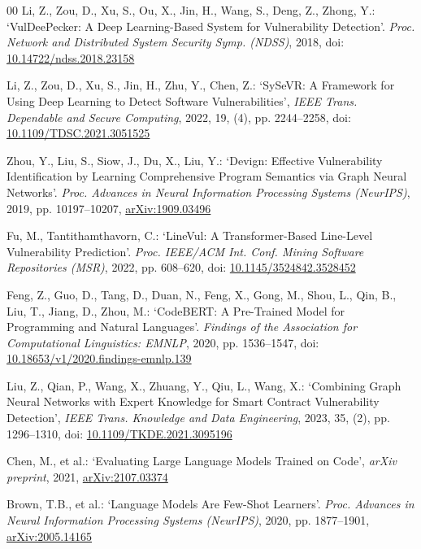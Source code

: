 \documentclass{ieeeaccess}
\begin{document}
\begin{thebibliography}{00}
Li, Z., Zou, D., Xu, S., Ou, X., Jin, H., Wang, S., Deng, Z., Zhong, Y.: `VulDeePecker: A Deep Learning-Based System for Vulnerability Detection'. \textit{Proc. Network and Distributed System Security Symp. (NDSS)}, 2018, doi: \href{https://doi.org/10.14722/ndss.2018.23158}{10.14722/ndss.2018.23158}

Li, Z., Zou, D., Xu, S., Jin, H., Zhu, Y., Chen, Z.: `SySeVR: A Framework for Using Deep Learning to Detect Software Vulnerabilities', \textit{IEEE Trans. Dependable and Secure Computing}, 2022, 19, (4), pp. 2244--2258, doi: \href{https://doi.org/10.1109/TDSC.2021.3051525}{10.1109/TDSC.2021.3051525}

Zhou, Y., Liu, S., Siow, J., Du, X., Liu, Y.: `Devign: Effective Vulnerability Identification by Learning Comprehensive Program Semantics via Graph Neural Networks'. \textit{Proc. Advances in Neural Information Processing Systems (NeurIPS)}, 2019, pp. 10197--10207, \href{https://arxiv.org/abs/1909.03496}{arXiv:1909.03496}

Fu, M., Tantithamthavorn, C.: `LineVul: A Transformer-Based Line-Level Vulnerability Prediction'. \textit{Proc. IEEE/ACM Int. Conf. Mining Software Repositories (MSR)}, 2022, pp. 608--620, doi: \href{https://doi.org/10.1145/3524842.3528452}{10.1145/3524842.3528452}

Feng, Z., Guo, D., Tang, D., Duan, N., Feng, X., Gong, M., Shou, L., Qin, B., Liu, T., Jiang, D., Zhou, M.: `CodeBERT: A Pre-Trained Model for Programming and Natural Languages'. \textit{Findings of the Association for Computational Linguistics: EMNLP}, 2020, pp. 1536--1547, doi: \href{https://doi.org/10.18653/v1/2020.findings-emnlp.139}{10.18653/v1/2020.findings-emnlp.139}

Liu, Z., Qian, P., Wang, X., Zhuang, Y., Qiu, L., Wang, X.: `Combining Graph Neural Networks with Expert Knowledge for Smart Contract Vulnerability Detection', \textit{IEEE Trans. Knowledge and Data Engineering}, 2023, 35, (2), pp. 1296--1310, doi: \href{https://doi.org/10.1109/TKDE.2021.3095196}{10.1109/TKDE.2021.3095196}

Chen, M., et al.: `Evaluating Large Language Models Trained on Code', \textit{arXiv preprint}, 2021, \href{https://arxiv.org/abs/2107.03374}{arXiv:2107.03374}

Brown, T.B., et al.: `Language Models Are Few-Shot Learners'. \textit{Proc. Advances in Neural Information Processing Systems (NeurIPS)}, 2020, pp. 1877--1901, \href{https://arxiv.org/abs/2005.14165}{arXiv:2005.14165}


\end{thebibliography}
\end{document}
